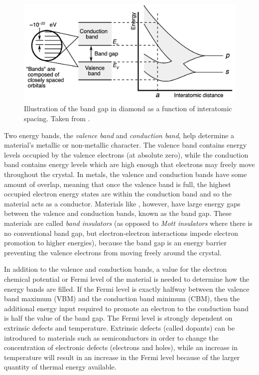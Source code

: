 \begin{figure}[ht]
\centering
\includegraphics[width=\linewidth]{images/band_gap.png}
\caption[Illustration of the band gap in diamond as a function of interatomic spacing.]{Illustration of the band gap in diamond as a function of interatomic spacing. Taken from \cite{Chetvorno2017}.}
\label{figure:band_gap}
\end{figure}

Two energy bands, the \emph{valence band} and \emph{conduction band}, help determine a material's metallic or non-metallic character. The valence band contains energy levels occupied by the valence electrons (at absolute zero), while the conduction band contains energy levels which are high enough that electrons may freely move throughout the crystal. In metals, the valence and conduction bands have some amount of overlap, meaning that once the valence band is full, the highest occupied electron energy states are within the conduction band and so the material acts as a conductor. Materials like \zirconia , however, have large energy gaps between the valence and conduction bands, known as the band gap. These materials are called \emph{band insulators} (as opposed to \emph{Mott insulators} where there is no conventional band gap, but electron-electron interactions impede electron promotion to higher energies), because the band gap is an energy barrier preventing the valence electrons from moving freely around the crystal. 

In addition to the valence and conduction bands, a value for the electron chemical potential or Fermi level of the material is needed to determine how the energy bands are filled. If the Fermi level is exactly halfway between the valence band maximum (VBM) and the conduction band minimum (CBM), then the additional energy input required to promote an electron to the conduction band is half the value of the band gap. The Fermi level is strongly dependent on extrinsic defects and temperature. Extrinsic defects (called dopants) can be introduced to materials such as semiconductors in order to change the concentration of electronic defects (electrons and holes), while an increase in temperature will result in an increase in the Fermi level because of the larger quantity of thermal energy available.

